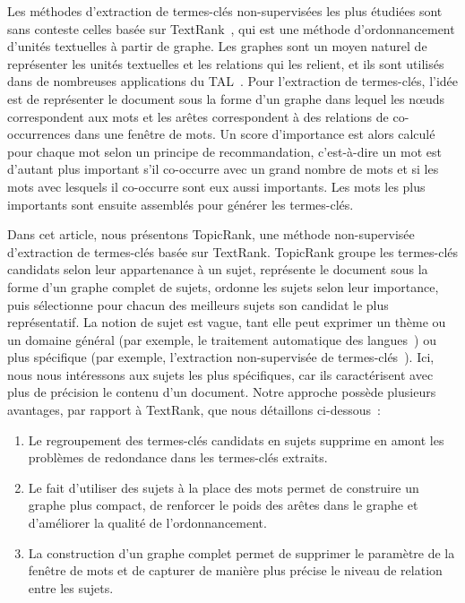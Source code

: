   Les méthodes d'extraction de termes-clés non-supervisées les plus étudiées
  sont sans conteste celles basée sur TextRank~\cite{mihalcea2004textrank}, qui
  est une méthode d'ordonnancement d'unités textuelles à partir de graphe. Les
  graphes sont un moyen naturel de représenter les unités textuelles et les
  relations qui les relient, et ils sont utilisés dans de nombreuses
  applications du TAL~\cite{kozareva2013textgraphs}. Pour l'extraction de
  termes-clés, l'idée est de représenter le document sous la forme d'un graphe
  dans lequel les n\oe{}uds correspondent aux mots et les arêtes correspondent à
  des relations de co-occurrences dans une fenêtre de mots. Un score
  d'importance est alors calculé pour chaque mot selon un principe de
  recommandation, c'est-à-dire un mot est d'autant plus important s'il
  co-occurre avec un grand nombre de mots et si les mots avec lesquels il
  co-occurre sont eux aussi importants. Les mots les plus importants sont
  ensuite assemblés pour générer les termes-clés.

  Dans cet article, nous présentons TopicRank, une méthode non-supervisée
  d'extraction de termes-clés basée sur TextRank. TopicRank groupe les
  termes-clés candidats selon leur appartenance à un sujet, représente le
  document sous la forme d'un graphe complet de sujets, ordonne les sujets selon
  leur importance, puis sélectionne pour chacun des meilleurs sujets son
  candidat le plus représentatif. La notion de sujet est vague, tant elle peut
  exprimer un thème ou un domaine général (par exemple, \og le traitement
  automatique des langues~\fg) ou plus spécifique (par exemple, \og l'extraction
  non-supervisée de termes-clés~\fg). Ici, nous nous intéressons aux sujets les
  plus spécifiques, car ils caractérisent avec plus de précision le contenu d'un
  document. Notre approche possède plusieurs avantages, par rapport à TextRank,
  que nous détaillons ci-dessous~:
  \begin{enumerate}
    \item{Le regroupement des termes-clés candidats en sujets supprime en amont
          les problèmes de redondance dans les termes-clés extraits.}
    \item{Le fait d'utiliser des sujets à la place des mots permet de construire
          un graphe plus compact, de renforcer le poids des arêtes dans le
          graphe et d'améliorer la qualité de l'ordonnancement.}
    \item{La construction d'un graphe complet permet de supprimer le paramètre
          de la fenêtre de mots et de capturer de manière plus précise le niveau
          de relation entre les sujets.}
  \end{enumerate}

